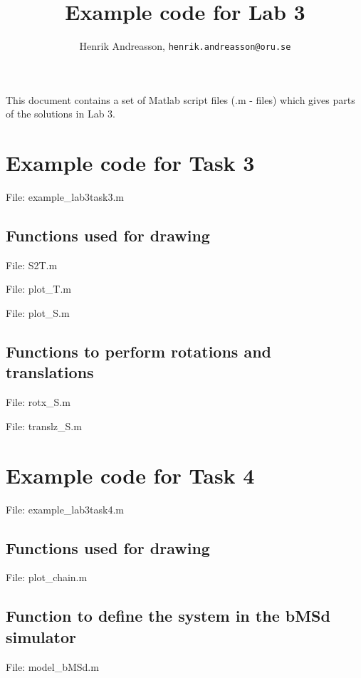 \documentclass[10pt,a4paper]{article}
\title{Example code for Lab 3}
\author{Henrik Andreasson, \texttt{henrik.andreasson@oru.se}}
\begin{document}
\maketitle

This document contains a set of Matlab script files (.m - files) which gives parts of the solutions in Lab 3. 

\section{Example code for Task 3} 

File: {\ttfamily  example\_lab3task3.m}



\subsection{Functions used for drawing}

File: {\ttfamily  S2T.m}



File: {\ttfamily  plot\_T.m}



File: {\ttfamily  plot\_S.m}



\subsection{Functions to perform rotations and translations}

File: {\ttfamily  rotx\_S.m}



File: {\ttfamily  translz\_S.m}





\section{Example code for Task 4}

File: {\ttfamily  example\_lab3task4.m}



\subsection{Functions used for drawing}

File: {\ttfamily  plot\_chain.m}



\subsection{Function to define the system in the bMSd simulator}

File: {\ttfamily  model\_bMSd.m}


\end{document}
